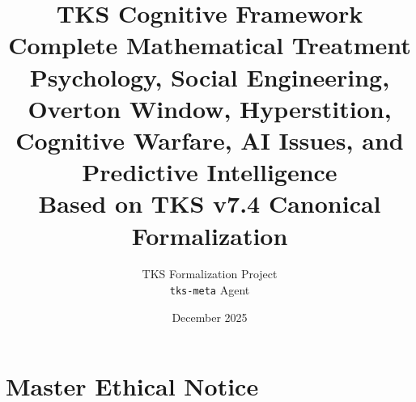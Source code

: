 \documentclass[11pt,twoside]{book}
\theoremstyle{definition}
\theoremstyle{plain}
\theoremstyle{remark}
\begin{document}
\title{\textbf{TKS Cognitive Framework}\\[0.5em]
\Large Complete Mathematical Treatment\\[0.3em]
\large Psychology, Social Engineering, Overton Window, Hyperstition,\\
Cognitive Warfare, AI Issues, and Predictive Intelligence\\[0.5em]
\normalsize Based on TKS v7.4 Canonical Formalization}
\author{TKS Formalization Project\\
\texttt{tks-meta} Agent}
\date{December 2025}
\maketitle

\tableofcontents

\chapter*{Master Ethical Notice}
\end{document}

